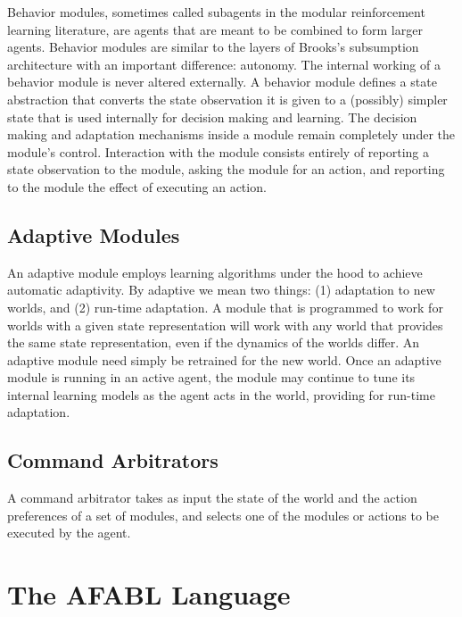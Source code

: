 Behavior modules, sometimes called subagents in the modular reinforcement learning literature, are agents that are meant to be combined to form larger agents.  Behavior modules are similar to the layers of Brooks's subsumption architecture with an important difference: autonomy.  The internal working of a behavior module is never altered externally.  A behavior module defines a state abstraction that converts the state observation it is given to a (possibly) simpler state that is used internally for decision making and learning.   The decision making and adaptation mechanisms inside a module remain completely under the module's control.  Interaction with the module consists entirely of reporting a state observation to the module, asking the module for an action, and reporting to the module the effect of executing an action.

\subsection{Adaptive Modules}

An adaptive module employs learning algorithms under the hood to achieve automatic adaptivity.  By adaptive we mean two things: (1) adaptation to new worlds, and (2) run-time adaptation.  A module that is programmed to work for worlds with a given state representation will work with any world that provides the same state representation, even if the dynamics of the worlds differ.  An adaptive module need simply be retrained for the new world.  Once an adaptive module is running in an active agent, the module may continue to tune its internal learning models as the agent acts in the world, providing for run-time adaptation.

\subsection{Command Arbitrators}

A command arbitrator takes as input the state of the world and the action preferences of a set of modules, and selects one of the modules or actions to be executed by the agent.

\section{The AFABL Language}

